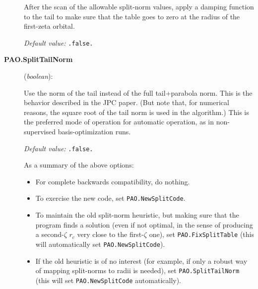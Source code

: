 \documentclass[11pt]{article}
\begin{document}
\begin{description}
After the scan of the allowable split-norm values, apply a damping
function to the tail to make sure that the table goes to zero at
the radius of the first-zeta orbital.

{\it Default value:} {\tt .false.}

\item[{\bf PAO.SplitTailNorm}] ({\it boolean}):

Use the norm of the tail instead of the full tail+parabola
norm. This is the behavior described in the JPC paper. (But note
that, for numerical reasons, the square root of the tail norm is used
in the algorithm.) This is the preferred mode of operation for
automatic operation, as in non-supervised basis-optimization runs.

{\it Default value:} {\tt .false.}

As a summary of the above options:
\begin{itemize}
\item For complete backwards compatibility, do nothing.
\item To exercise the new code, set {\tt PAO.NewSplitCode}.
\item To maintain the old split-norm heuristic, but
making sure that the program finds a solution (even
if not optimal, in the sense of producing a second-$\zeta$ $r_c$
very close to the first-$\zeta$ one), set {\tt PAO.FixSplitTable}
(this will automatically set {\tt PAO.NewSplitCode}).
\item If the old heuristic is of no interest (for example, if
only a robust way of mapping split-norms to radii is needed), set
{\tt PAO.SplitTailNorm} (this will set {\tt PAO.NewSplitCode}
automatically).
\end{itemize}

\end{description}
\end{document}

